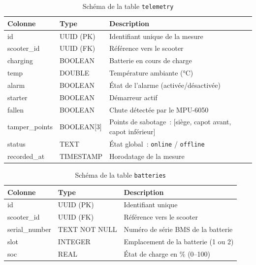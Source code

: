 \documentclass[12pt, a4paper]{report}
\begin{document}
\begin{table}[H]
  \centering
  \caption{Schéma de la table \texttt{telemetry}}
  \label{tab:table_telemetry}
  \renewcommand{\arraystretch}{1.4}
  \small
  \begin{tabularx}{\textwidth}{|p{3cm}|p{2.5cm}|X|}
    \hline
    \rowcolor{isimablue!20}
    \textbf{Colonne} & \textbf{Type} & \textbf{Description} \\
    \hline
    id            & UUID (PK)        & Identifiant unique de la mesure \\
    \hline
    scooter\_id   & UUID (FK)        & Référence vers le scooter \\
    \hline
    charging      & BOOLEAN          & Batterie en cours de charge \\
    \hline
    temp          & DOUBLE           & Température ambiante (°C) \\
    \hline
    alarm         & BOOLEAN          & État de l'alarme (activée/désactivée) \\
    \hline
    starter       & BOOLEAN          & Démarreur actif \\
    \hline
    fallen        & BOOLEAN          & Chute détectée par le MPU-6050 \\
    \hline
    tamper\_points & BOOLEAN[3]      & Points de sabotage~: [siège, capot avant, capot inférieur] \\
    \hline
    status        & TEXT             & État global~: \texttt{online} / \texttt{offline} \\
    \hline
    recorded\_at  & TIMESTAMP        & Horodatage de la mesure \\
    \hline
  \end{tabularx}
\end{table}

\begin{table}[H]
  \centering
  \caption{Schéma de la table \texttt{batteries}}
  \label{tab:table_batteries}
  \renewcommand{\arraystretch}{1.4}
  \small
  \begin{tabularx}{\textwidth}{|p{3cm}|p{2.5cm}|X|}
    \hline
    \rowcolor{isimablue!20}
    \textbf{Colonne} & \textbf{Type} & \textbf{Description} \\
    \hline
    id            & UUID (PK)  & Identifiant unique \\
    \hline
    scooter\_id   & UUID (FK)  & Référence vers le scooter \\
    \hline
    serial\_number & TEXT NOT NULL & Numéro de série BMS de la batterie \\
    \hline
    slot          & INTEGER    & Emplacement de la batterie (1 ou 2) \\
    \hline
    soc           & REAL       & État de charge en \% (0--100) \\
    \hline
  \end{tabularx}
\end{table}
\end{document}
